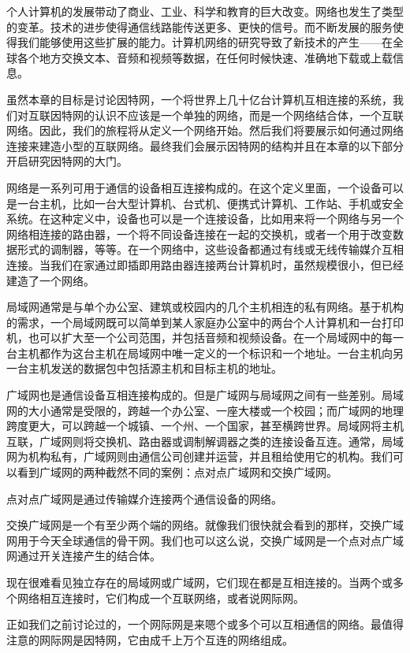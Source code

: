 
个人计算机的发展带动了商业、工业、科学和教育的巨大改变。网络也发生了类型的变革。技术的进步使得通信线路能传送更多、更快的信号。而不断发展的服务使得我们能够使用这些扩展的能力。计算机网络的研究导致了新技术的产生——在全球各个地方交换文本、音频和视频等数据，在任何时候快速、准确地下载或上载信息。

虽然本章的目标是讨论因特网，一个将世界上几十亿台计算机互相连接的系统，我们对互联因特网的认识不应该是一个单独的网络，而是一个网络结合体，一个互联网络。因此，我们的旅程将从定义一个网络开始。然后我们将要展示如何通过网络连接来建造小型的互联网络。最终我们会展示因特网的结构并且在本章的以下部分开启研究因特网的大门。

网络是一系列可用于通信的设备相互连接构成的。在这个定义里面，一个设备可以是一台主机，比如一台大型计算机、台式机、便携式计算机、工作站、手机或安全系统。在这种定义中，设备也可以是一个连接设备，比如用来将一个网络与另一个网络相连接的路由器，一个将不同设备连接在一起的交换机，或者一个用于改变数据形式的调制器，等等。在一个网络中，这些设备都通过有线或无线传输媒介互相连接。当我们在家通过即插即用路由器连接两台计算机时，虽然规模很小，但已经建造了一个网络。

局域网通常是与单个办公室、建筑或校园内的几个主机相连的私有网络。基于机构的需求，一个局域网既可以简单到某人家庭办公室中的两台个人计算机和一台打印机，也可以扩大至一个公司范围，并包括音频和视频设备。在一个局域网中的每一台主机都作为这台主机在局域网中唯一定义的一个标识和一个地址。一台主机向另一台主机发送的数据包中包括源主机和目标主机的地址。

广域网也是通信设备互相连接构成的。但是广域网与局域网之间有一些差别。局域网的大小通常是受限的，跨越一个办公室、一座大楼或一个校园；而广域网的地理跨度更大，可以跨越一个城镇、一个州、一个国家，甚至横跨世界。局域网将主机互联，广域网则将交换机、路由器或调制解调器之类的连接设备互连。通常，局域网为机构私有，广域网则由通信公司创建并运营，并且租给使用它的机构。我们可以看到广域网的两种截然不同的案例：点对点广域网和交换广域网。

点对点广域网是通过传输媒介连接两个通信设备的网络。

交换广域网是一个有至少两个端的网络。就像我们很快就会看到的那样，交换广域网用于今天全球通信的骨干网。我们也可以这么说，交换广域网是一个点对点广域网通过开关连接产生的结合体。

现在很难看见独立存在的局域网或广域网，它们现在都是互相连接的。当两个或多个网络相互连接时，它们构成一个互联网络，或者说网际网。

正如我们之前讨论过的，一个网际网是来嗯个或多个可以互相通信的网络。最值得注意的网际网是因特网，它由成千上万个互连的网络组成。

